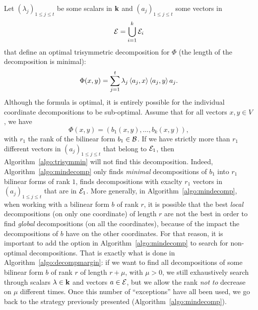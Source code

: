 Let $(\lambda_j)_{1\leq j\leq t}$ be some scalars in $\mathbf{k}$ and $(a_j)_{1\leq
j\leq t}$ some vectors in
\[
  \mathcal{E}=\bigcup_{i=1}^k\mathcal{E}_i
\]
that define an optimal trisymmetric decomposition for $\Phi$
(\ie the length of the decomposition is minimal): 
\[
  \Phi(x, y) = \sum_{j=1}^t\lambda_j\left\langle a_j,x\right\rangle\left\langle a_j,y\right\rangle a_j.
\]
Although the formula is optimal, it is entirely possible for the individual
coordinate decompositions to be sub-optimal. Assume that for all vectors $x,
y\in V$, we have
\[
  \Phi(x, y) = (b_1(x, y), \dots, b_k(x, y)),
\]
with $r_1$ the rank of the bilinear form $b_1\in\mathcal{B}$. If we have strictly more
than $r_1$ different vectors in $(a_j)_{1\leq j\leq t}$ that belong to $\mathcal{E}_1$,
then Algorithm~\ref{algo:trisymmin} will not find this decomposition. Indeed,
Algorithm~\ref{algo:mindecomp} only finds \emph{minimal} decompositions of $b_1$
into $r_1$ bilinear forms of rank $1$, \ie finds decompositions with exaclty
$r_1$ vectors in $(a_j)_{1\leq j\leq t}$ that are in $\mathcal{E}_1$. More generally, in
Algorithm~\ref{algo:mindecomp}, when working with a bilinear form $b$ of rank
$r$, it is possible that the best \emph{local} decompositions (\ie on only one
coordinate) of length $r$ are not the best in order to find \emph{global}
decompositions (\ie on all the coordinates), because of the impact the
decompositions of $b$ have on the other coordinates. For that reason, it is
important to add the option in Algorithm~\ref{algo:mindecomp} to search for
non-optimal decompositions. That is exactly what is done in
Algorithm~\ref{algo:decompmargin}: if we want to find all decompositions of some
bilinear form $b$ of rank $r$ of length $r+\mu$, with $\mu>0$, we still
exhaustively search through scalars $\lambda\in\mathbf{k}$ and vectors $a\in\mathcal{E}$, but we
allow the rank \emph{not to} decrease on $\mu$ different times. Once this number
of ``exceptions'' have all been used, we go back to the strategy previously
presented (\ie Algorithm~\ref{algo:mindecomp}).
%

